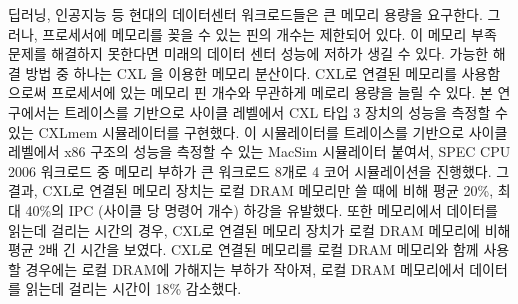 \begin{KoreanAbstract}
  딥러닝, 인공지능 등 현대의 데이터센터 워크로드들은 큰 메모리 용량을 요구한다. 그러나, 프로세서에 메모리를 꽂을 수 있는 핀의 개수는 제한되어 있다. 이 메모리 부족 문제를 해결하지 못한다면 미래의 데이터 센터 성능에 저하가 생길 수 있다. 가능한 해결 방법 중 하나는 CXL \cite{CXL}을 이용한 메모리 분산이다. CXL로 연결된 메모리를 사용함으로써 프로세서에 있는 메모리 핀 개수와 무관하게 메로리 용량을 늘릴 수 있다. 본 연구에서는 트레이스를 기반으로 사이클 레벨에서 CXL 타입 3 장치의 성능을 측정할 수 있는 CXLmem 시뮬레이터를 구현했다. 이 시뮬레이터를 트레이스를 기반으로 사이클 레벨에서 x86 구조의 성능을 측정할 수 있는 MacSim 시뮬레이터 붙여서, SPEC CPU 2006 워크로드 중 메모리 부하가 큰 워크로드 8개로 4 코어 시뮬레이션을 진행했다. 그 결과, CXL로 연결된 메모리 장치는 로컬 DRAM 메모리만 쓸 때에 비해 평균 20\%, 최대 40\%의 IPC (사이클 당 명령어 개수) 하강을 유발했다. 또한 메모리에서 데이터를 읽는데 걸리는 시간의 경우, CXL로 연결된 메모리 장치가 로컬 DRAM 메모리에 비해 평균 2배 긴 시간을 보였다. CXL로 연결된 메모리를 로컬 DRAM 메모리와 함께 사용할 경우에는 로컬 DRAM에 가해지는 부하가 작아져, 로컬 DRAM 메모리에서 데이터를 읽는데 걸리는 시간이 18\% 감소했다.
\end{KoreanAbstract}
